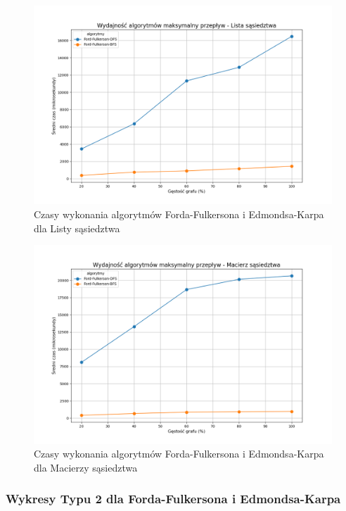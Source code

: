 \documentclass{article}
\begin{document}
\begin{figure}[H]
    \centering
    \includegraphics[scale=0.5]{../Python/charts_type1/Typ1_MAX_FLOW_Lista_sąsiedztwa_wykres.png}
    \caption{Czasy wykonania algorytmów Forda-Fulkersona i Edmondsa-Karpa dla Listy sąsiedztwa}
\end{figure}
\begin{figure}[H]
    \centering
    \includegraphics[scale=0.5]{../Python/charts_type1/Typ1_MAX_FLOW_Macierz_sąsiedztwa_wykres.png}
    \caption{Czasy wykonania algorytmów Forda-Fulkersona i Edmondsa-Karpa dla Macierzy sąsiedztwa}
\end{figure}

\subsubsection{Wykresy Typu 2 dla Forda-Fulkersona i Edmondsa-Karpa}
\end{document}
